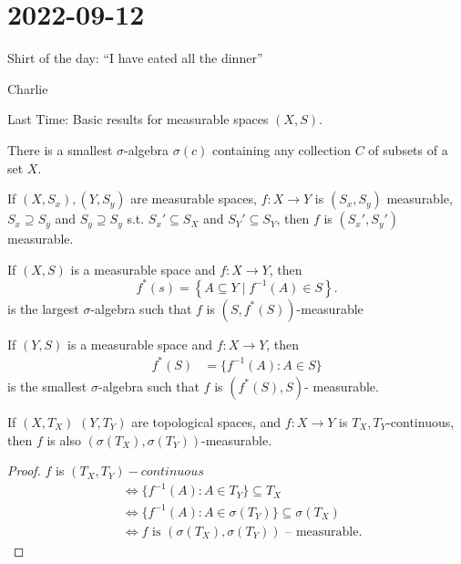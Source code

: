 \section{2022-09-12}

\epigraph{Shirt of the day: ``I have eated all the dinner''}{Charlie}

Last Time: Basic results for measurable spaces $(X, S)$.

\begin{theorem}
  There is a smallest $\sigma$-algebra $\sigma(c)$ containing any collection $C$ of subsets of a set $X$.
\end{theorem}

\begin{lemma}
	If $(X,S_x), (Y,S_y)$ are measurable spaces, $f: X \to Y$ is $(S_x, S_y)$ measurable, $S_x \supseteq S_y$ and $S_y\supseteq S_y$ s.t. $S_x' \subseteq S_X$ and $S_Y' \subseteq S_Y$, then $f$ is $(S_x', S_y')$ measurable.
\end{lemma}

\begin{theorem}
  If $(X, S)$ is a measurable space and $f: X \to Y$, then 
	\[
		f^*(s) = \left\{A \subseteq Y \mid f^{-1}(A) \in S \right\}.
	\]
	is the largest $\sigma$-algebra such that $f$ is $(S, f^*(S))$-measurable
\end{theorem}

\begin{theorem}
	If $(Y,S)$ is a measurable space and $f : X \to Y$, then 
	 \begin{align*}
		 f^*(S) &= \{f^{-1}(A) : A \in S\}
	\end{align*}
	is the smallest $\sigma$-algebra such that $f$ is $(f^*(S), S)$- measurable.
\end{theorem}

\begin{theorem}
	If $(X, T_X)$ $(Y,T_Y)$ are topological spaces, and  $f : X \to Y$ is $T_X, T_Y$-continuous, then $f$ is also $(\sigma(T_X), \sigma(T_Y))$-measurable.
\end{theorem}

\begin{proof}
	$f$ is $(T_X,T_Y)-continuous$
	\begin{align*}
		&\iff \{f^{-1}(A) : A \in T_Y\} \subseteq T_X \\
		&\iff \{f^{-1}(A) : A \in \sigma(T_Y)\} \subseteq \sigma(T_X) \\
		&\iff f \text{ is } (\sigma(T_X), \sigma(T_Y)) \text{ -- measurable.}
	\end{align*}  
\end{proof}

